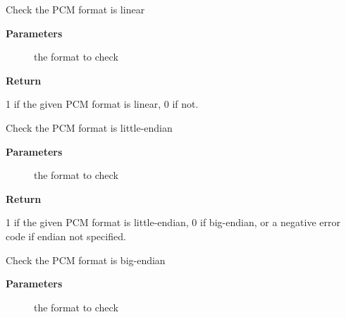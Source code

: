 \documentclass[a4paper,8pt,english]{sphinxmanual}
\begin{document}
\begin{fulllineitems}
\label{sound/kernel-api/alsa-driver-api:c.snd_pcm_format_linear}
Check the PCM format is linear

\end{fulllineitems}


\textbf{Parameters}
\begin{description}
\item[{}] \leavevmode
the format to check

\end{description}

\textbf{Return}

1 if the given PCM format is linear, 0 if not.

\begin{fulllineitems}
\label{sound/kernel-api/alsa-driver-api:c.snd_pcm_format_little_endian}
Check the PCM format is little-endian

\end{fulllineitems}


\textbf{Parameters}
\begin{description}
\item[{}] \leavevmode
the format to check

\end{description}

\textbf{Return}

1 if the given PCM format is little-endian, 0 if
big-endian, or a negative error code if endian not specified.

\begin{fulllineitems}
\label{sound/kernel-api/alsa-driver-api:c.snd_pcm_format_big_endian}
Check the PCM format is big-endian

\end{fulllineitems}


\textbf{Parameters}
\begin{description}
\item[{}] \leavevmode
the format to check

\end{description}
\end{document}
